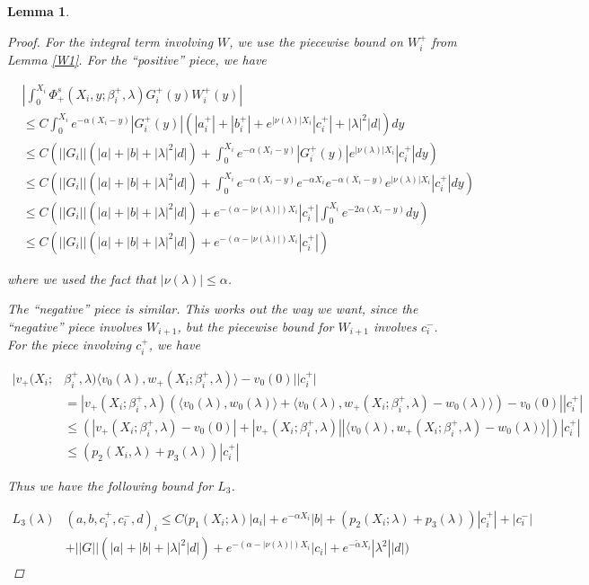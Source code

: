\documentclass[12pt]{article}
\newtheorem{lemma}{Lemma}
\begin{document}
\begin{lemma}
\begin{proof}
For the integral term involving $W$, we use the piecewise bound on $W_i^+$ from Lemma \ref{W1}. For the ``positive'' piece, we have

\begin{align*}
&\left| \int_0^{X_i} \Phi^s_+(X_i, y; \beta_i^+, \lambda) G_i^+(y) W_i^+(y) \right| \\
&\leq C \int_0^{X_i} e^{-\alpha(X_i - y)}|G_i^+(y)|(|a_i^+| + |b_i^+| + e^{|\nu(\lambda)|X_i}|c_i^+| + |\lambda|^2 |d| ) dy \\
&\leq C \left( ||G_i||(|a| + |b| + |\lambda|^2 |d|) + \int_0^{X_i} e^{-\alpha(X_i - y)}|G_i^+(y)|e^{|\nu(\lambda)|X_i}|c_i^+| dy \right) \\
&\leq C \left( ||G_i||(|a| + |b| + |\lambda|^2 |d|) + \int_0^{X_i} e^{-\alpha(X_i - y)}e^{-\alpha X_i} e^{-\alpha(X_i - y)} e^{|\nu(\lambda)|X_i}|c_i^+| dy \right)\\
&\leq C \left( ||G_i||(|a| + |b| + |\lambda|^2 |d|) + e^{-(\alpha - |\nu(\lambda)|)X_i} |c_i^+| \int_0^{X_i} e^{-2\alpha(X_i - y)} dy \right) \\
&\leq C \left( ||G_i||(|a| + |b| + |\lambda|^2 |d|) + e^{-(\alpha - |\nu(\lambda)|)X_i} |c_i^+| \right)
\end{align*}

where we used the fact that $|\nu(\lambda)| \leq \alpha$.  

The ``negative'' piece is similar. This works out the way we want, since the ``negative'' piece involves $W_{i+1}$, but the piecewise bound for $W_{i+1}$ involves $c_i^-$.\\

For the piece involving $c_i^+$, we have

\begin{align*}
|v_+(X_i; &\beta_i^+, \lambda) \langle v_0(\lambda), w_+(X_i; \beta_i^+, \lambda) \rangle - v_0(0) | |c_i^+| \\
&= |v_+(X_i; \beta_i^+, \lambda) (\langle v_0(\lambda), w_0(\lambda) \rangle + \langle v_0(\lambda), w_+(X_i; \beta_i^+, \lambda) - w_0(\lambda) \rangle) - v_0(0) | |c_i^+| \\
&\leq (|v_+(X_i; \beta_i^+, \lambda) - v_0(0)| 
+ |v_+(X_i; \beta_i^+, \lambda)||\langle v_0(\lambda), w_+(X_i; \beta_i^+, \lambda) - w_0(\lambda) \rangle|)|c_i^+| \\
&\leq (p_2(X_i, \lambda) + p_3(\lambda))|c_i^+|
\end{align*}

Thus we have the following bound for $L_3$.

\begin{align*}
L_3(\lambda)&(a, b, c_i^+, c_i^-, d)_i \leq C ( p_1(X_i; \lambda)|a_i|
+ e^{-\alpha X_i}|b| + (p_2(X_i; \lambda) + p_3(\lambda))|c_i^+| + |c_i^-| \\
&+ ||G||(|a| + |b| + |\lambda|^2 |d|) + e^{-(\alpha - |\nu(\lambda)|)X_i} |c_i| + e^{-\tilde{\alpha} X_i} |\lambda^2| |d| )
\end{align*}


\end{proof}
\end{lemma}
\end{document}
